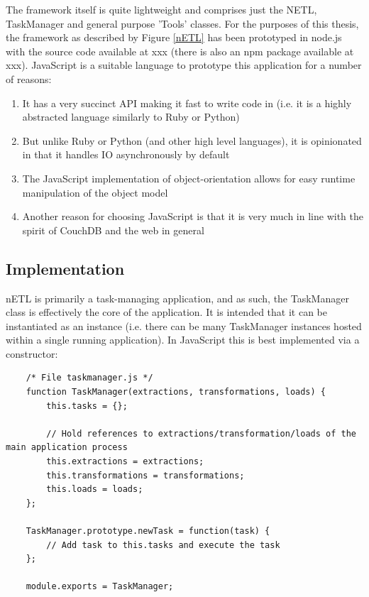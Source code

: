 The framework itself is quite lightweight and comprises just the NETL, TaskManager and general purpose 'Tools' classes. For the purposes of this thesis, the framework as described by Figure \ref{nETL} has been prototyped in node.js with the source code available at xxx (there is also an npm package available at xxx). JavaScript is a suitable language to prototype this application for a number of reasons:

\begin{enumerate}
    \item It has a very succinct API making it fast to write code in (i.e. it is a highly abstracted language similarly to Ruby or Python)
    \item But unlike Ruby or Python (and other high level languages), it is opinionated in that it handles IO asynchronously by default
    \item The JavaScript implementation of object-orientation allows for easy runtime manipulation of the object model
    \item Another reason for choosing JavaScript is that it is very much in line with the spirit of CouchDB and the web in general
\end{enumerate}

\subsection{Implementation}

nETL is primarily a task-managing application, and as such, the TaskManager class is effectively the core of the application. It is intended that it can be instantiated as an instance (i.e. there can be many TaskManager instances hosted within a single running application). In JavaScript this is best implemented via a constructor:

\begin{verbatim}
    /* File taskmanager.js */
    function TaskManager(extractions, transformations, loads) {
        this.tasks = {};

        // Hold references to extractions/transformation/loads of the main application process
        this.extractions = extractions;
        this.transformations = transformations;
        this.loads = loads;
    };

    TaskManager.prototype.newTask = function(task) {
        // Add task to this.tasks and execute the task
    };

    module.exports = TaskManager;
\end{verbatim}

